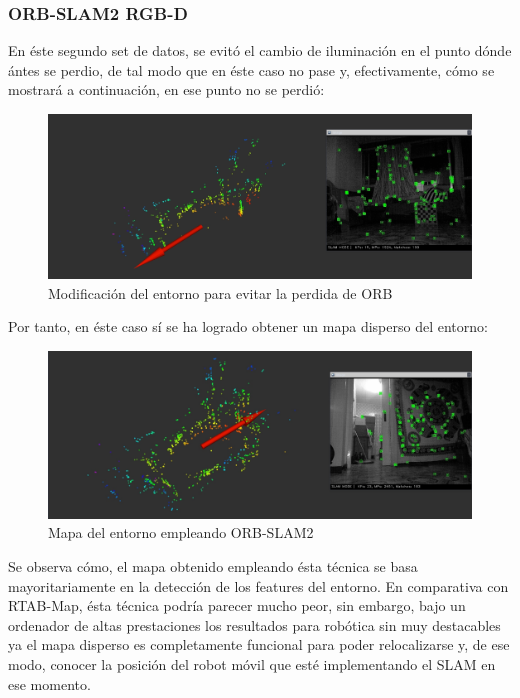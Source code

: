 \newpage
\subsubsection{ORB-SLAM2 RGB-D}
En éste segundo set de datos, se evitó el cambio de iluminación en el punto dónde ántes se perdio, de tal modo que en éste caso no pase y, efectivamente, cómo se mostrará a continuación,
en ese punto no se perdió:
\begin{figure}[h!]
    \centering
    \includegraphics[width=.9\textwidth]{images/slam/bag3_orb_avoidLOSE}
    \caption{Modificación del entorno para evitar la perdida de ORB}
\end{figure}

Por tanto, en éste caso sí se ha logrado obtener un mapa disperso del entorno:
\begin{figure}[h!]
    \centering
    \includegraphics[width=.9\textwidth]{images/slam/bag3_orb_map}
    \caption{Mapa del entorno empleando ORB-SLAM2}
\end{figure}

Se observa cómo, el mapa obtenido empleando ésta técnica se basa mayoritariamente en la detección de los features del entorno. En comparativa con RTAB-Map, ésta técnica podría parecer
mucho peor, sin embargo, bajo un ordenador de altas prestaciones los resultados para robótica sin muy destacables ya el mapa disperso es completamente funcional para poder relocalizarse
y, de ese modo, conocer la posición del robot móvil que esté implementando el SLAM en ese momento.
\newpage
